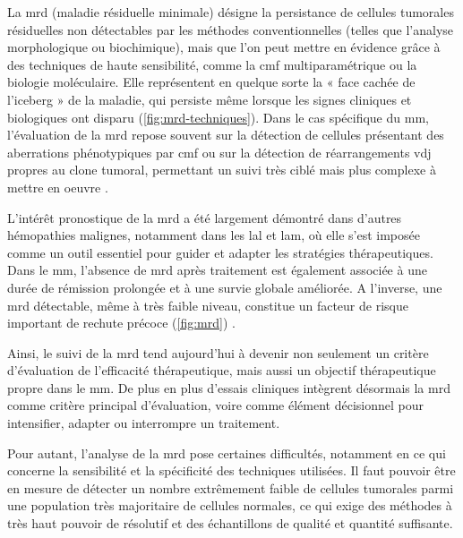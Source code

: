 \vspace{1em}

La \gls{mrd} (maladie résiduelle minimale) désigne la persistance de cellules tumorales résiduelles non détectables 
par les méthodes conventionnelles (telles que l'analyse morphologique ou biochimique), mais que l'on peut mettre en évidence 
grâce à des techniques de haute sensibilité, comme la \gls{cmf} multiparamétrique ou la biologie moléculaire. Elle représentent 
en quelque sorte la « face cachée de l'iceberg » de la maladie, qui persiste même lorsque les signes cliniques et biologiques 
ont disparu (\autoref{fig:mrd-techniques}).
Dans le cas spécifique du \gls{mm}, l'évaluation de la \gls{mrd} repose souvent sur la détection de cellules présentant des 
aberrations phénotypiques par \gls{cmf} ou sur la détection de réarrangements \gls{vdj} propres au clone tumoral, permettant un suivi très ciblé 
mais plus complexe à mettre en oeuvre \cite{bertaminiMRDAssessmentMultiple2021}.



L'intérêt pronostique de la \gls{mrd} a été largement démontré dans d'autres hémopathies malignes, notamment dans les \gls{lal} et \gls{lam}, 
où elle s'est imposée comme un outil essentiel pour guider et adapter les stratégies thérapeutiques. Dans le \gls{mm}, l'absence de \gls{mrd} 
après traitement est également associée à une durée de rémission prolongée et à une survie globale améliorée. A l'inverse, une \gls{mrd} détectable, 
même à très faible niveau, constitue un facteur de risque important de rechute précoce (\autoref{fig:mrd})
\cite{munshiLargeMetaanalysisEstablishes2020}.

\vspace{1em}

Ainsi, le suivi de la \gls{mrd} tend aujourd'hui à devenir non seulement un critère d'évaluation de l'efficacité thérapeutique, mais aussi un objectif 
thérapeutique propre dans le \gls{mm}. De plus en plus d'essais cliniques intègrent désormais la \gls{mrd} comme critère principal d'évaluation, 
voire comme élément décisionnel pour intensifier, adapter ou interrompre un traitement.



Pour autant, l'analyse de la \gls{mrd} pose certaines difficultés, notamment en ce qui concerne la sensibilité et la spécificité des techniques utilisées.
Il faut pouvoir être en mesure de détecter un nombre extrêmement faible de cellules tumorales parmi une population très majoritaire de cellules normales,
ce qui exige des méthodes à très haut pouvoir de résolutif et des échantillons de qualité et quantité suffisante.


